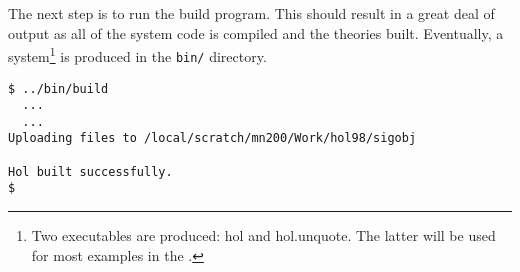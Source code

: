 \noindent The next step is to run the \textsf{build} program.  This should
result in a great deal of output as all of the system code is compiled
and the theories built.  Eventually, a \HOL{} system\footnote{Two
  executables are produced: \textsf{hol} and \textsf{hol.unquote}.  The
  latter will be used for most examples in the \TUTORIAL{}.} is
produced in the \texttt{bin/} directory.

\begin{session}
\begin{verbatim}
$ ../bin/build
  ...
  ...
Uploading files to /local/scratch/mn200/Work/hol98/sigobj

Hol built successfully.
$
\end{verbatim}
\end{session}



